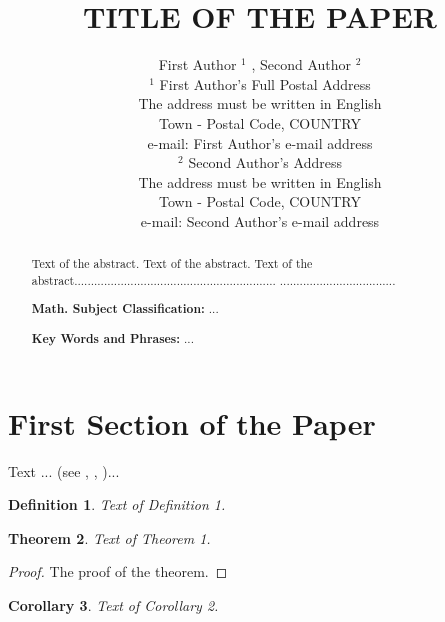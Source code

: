 \documentclass[12pt]{article}
\theoremstyle{theorem}
\newtheorem{theorem}{Theorem}
\newtheorem{corollary}[theorem]{Corollary}
\theoremstyle{defi}
\newtheorem{definition}[theorem]{Definition}
\begin{document}

\title{TITLE OF THE PAPER}

\author{First Author $^1$ , Second Author $^2$\\[6pt]
$^1$ First Author's Full Postal Address\\ The address must be written in English\\
Town - Postal Code, COUNTRY\\
e-mail: First Author's e-mail address\\[6pt]
$^2$ Second Author's Address\\ The address must be written in English\\
Town - Postal Code, COUNTRY \\ e-mail: Second Author's e-mail
address}

\maketitle

\begin{abstract}

Text of the abstract. Text of the abstract. Text of the
abstract.............................................................
...................................

\medskip

{\bf Math. Subject Classification:} ...

{\bf Key Words and Phrases:} ...

\end{abstract}

\section{First Section of the Paper}

Text ... (see \cite{gasrah}, \cite{rosbl}, \cite{Moak})...


\begin{definition}
Text of Definition 1.
\end{definition}

\begin{theorem}
Text of Theorem 1.
\end{theorem}

\begin{proof}
The proof of the theorem.
\end{proof}

\begin{corollary}
Text of Corollary 2.
\end{corollary}
\end{document}
